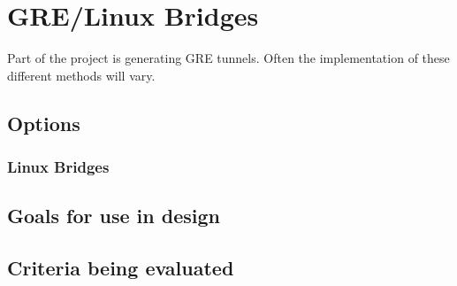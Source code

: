 \documentclass[10pt,letterpaper,onecolumn,draftclsnofoot]{IEEEtran}
\begin{document}

\section{GRE/Linux Bridges}
Part of the project is generating GRE tunnels. Often the implementation of these
different methods will vary.

\subsection{Options}

\subsubsection{Linux Bridges}

\subsubsection{}

\subsubsection{}

\subsection{Goals for use in design}

\subsection{Criteria being evaluated}

\subsubsection{}

\subsubsection{}

\subsubsection{}

\subsubsection{}
\end{document}
